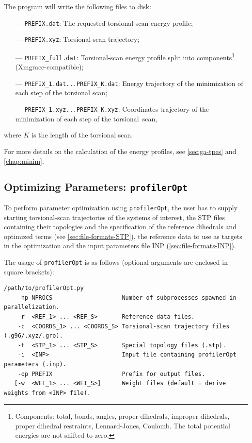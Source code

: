 \documentclass[10pt,a4paper,openany]{memoir}
\numberwithin{equation}{section}
\newcommand{\profileropt}[0]{\texttt{profilerOpt}}
\begin{document}
\noindent The program will write the following files to disk:
\begin{itemize}
\item[---] \texttt{PREFIX.dat}: The requested torsional-scan energy profile;
\item[---] \texttt{PREFIX.xyz}: Torsional-scan trajectory;
\item[---] \texttt{PREFIX\_full.dat}: Torsional-scan energy profile split into components\footnote{Components: total, bonds, angles, proper dihedrals, improper dihedrals, proper dihedral restraints, Lennard-Jones, Coulomb. The total potential energies are not shifted to zero.} (Xmgrace-compatible);
\item[---] \texttt{PREFIX\_1.dat...PREFIX\_K.dat}: Energy trajectory of the minimization of each step of the torsional scan;
\item[---] \texttt{PREFIX\_1.xyz...PREFIX\_K.xyz}: Coordinates trajectory of the minimization of each step of the torsional~scan,
\end{itemize}
where $K$ is the length of the torsional scan.

For more details on the calculation of the energy profiles, see \autoref{sec:ga-tpes} and \autoref{chap:minim}.

\subsection{Optimizing Parameters: \profileropt{}}
\label{sec:program-opt}

To perform parameter optimization using \profileropt{}, the user has
to supply starting torsional-scan trajectories of the systems of
interest, the STP files containing their topologies and the
specification of the reference dihedrals and optimized terms (see
\autoref{sec:file-formats-STP}), the reference data to use as targets
in the optimization and the input parameters file INP
(\autoref{sec:file-formats-INP}).

The usage of \profileropt{} is as follows (optional arguments are
enclosed in square brackets):

\begin{lstlisting}
/path/to/profilerOpt.py
    -np NPROCS                    Number of subprocesses spawned in parallelization.
    -r  <REF_1> ... <REF_S>       Reference data files.
    -c  <COORDS_1> ... <COORDS_S> Torsional-scan trajectory files (.g96/.xyz/.gro).
    -t  <STP_1> ... <STP_S>       Special topology files (.stp).
    -i  <INP>                     Input file containing profilerOpt parameters (.inp).
    -op PREFIX                    Prefix for output files.
   [-w  <WEI_1> ... <WEI_S>]      Weight files (default = derive weights from <INP> file).
\end{lstlisting}\vspace{1ex}
\end{document}
